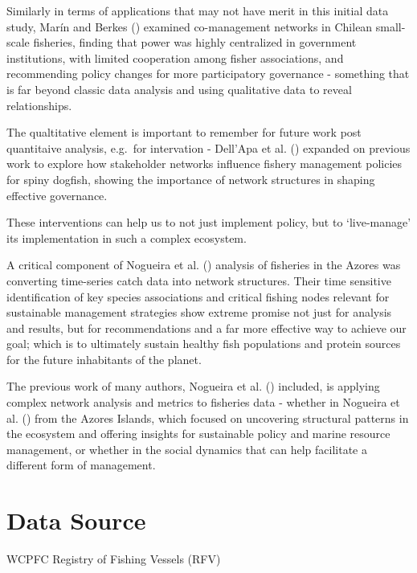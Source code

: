 \documentclass[
  letterpaper,
  DIV=11,
  numbers=noendperiod]{scrartcl}
\begin{document}
Similarly in terms of applications that may not have merit in this
initial data study, Marín and Berkes
() examined co-management
networks in Chilean small-scale fisheries, finding that power was highly
centralized in government institutions, with limited cooperation among
fisher associations, and recommending policy changes for more
participatory governance - something that is far beyond classic data
analysis and using qualitative data to reveal relationships.

The qualtitative element is important to remember for future work post
quantitaive analysis, e.g.~for intervation - Dell'Apa et al.
() expanded on previous work to
explore how stakeholder networks influence fishery management policies
for spiny dogfish, showing the importance of network structures in
shaping effective governance.

These interventions can help us to not just implement policy, but to
`live-manage' its implementation in such a complex ecosystem.

A critical component of Nogueira et al.
() analysis of fisheries in the
Azores was converting time-series catch data into network structures.
Their time sensitive identification of key species associations and
critical fishing nodes relevant for sustainable management strategies
show extreme promise not just for analysis and results, but for
recommendations and a far more effective way to achieve our goal; which
is to ultimately sustain healthy fish populations and protein sources
for the future inhabitants of the planet.

The previous work of many authors, Nogueira et al.
() included, is applying
complex network analysis and metrics to fisheries data - whether in
Nogueira et al. () from the
Azores Islands, which focused on uncovering structural patterns in the
ecosystem and offering insights for sustainable policy and marine
resource management, or whether in the social dynamics that can help
facilitate a different form of management.

\section{Data Source}\label{data-source}

WCPFC Registry of Fishing Vessels (RFV)
\end{document}
